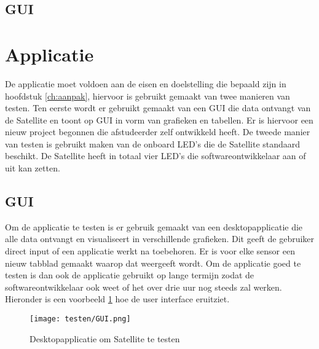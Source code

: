 \newpage

\subsection{GUI}
\section{Applicatie}
De applicatie moet voldoen aan de eisen en doelstelling die bepaald zijn in hoofdstuk \ref{ch:aanpak}, hiervoor is gebruikt gemaakt van twee manieren van testen. Ten eerste wordt er gebruikt gemaakt van een GUI die data ontvangt van de Satellite en toont op GUI in vorm van grafieken en tabellen. Er is hiervoor een nieuw project begonnen die afstudeerder zelf ontwikkeld heeft. De tweede manier van testen is gebruikt maken van de onboard LED's die de Satellite standaard beschikt. De Satellite heeft in totaal vier LED's die softwareontwikkelaar aan of uit kan zetten. 



\subsection{GUI}
Om de applicatie te testen is er gebruik gemaakt van een desktopapplicatie die alle data ontvangt en visualiseert in verschillende grafieken. Dit geeft de gebruiker direct input of een applicatie werkt na toebehoren. Er is voor elke sensor een nieuw tabblad gemaakt waarop dat weergeeft wordt. Om de applicatie goed te testen is dan ook de applicatie gebruikt op lange termijn zodat de softwareontwikkelaar ook weet of het over drie uur nog steeds zal werken. Hieronder is een voorbeeld \ref{fig:guitest} hoe de user interface eruitziet. 
\begin{figure}[h!]
	\centering

	\label{fig:guitest}
	\texttt{[image: testen/GUI.png]}
	\caption{Desktopapplicatie om Satellite te testen}
\end{figure}

\newpage
